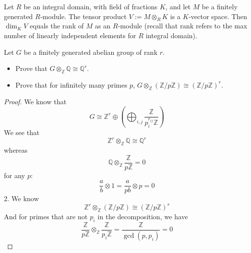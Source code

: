 \documentclass[openany]{book}
\newcommand{\Z}{\mathbb{Z}}
\newcommand{\Q}{\mathbb{Q}}
\begin{document}
    \begin{prop}[2.8]
    Let \( R \) be an integral domain, with field of fractions \( K \), and let \( M \) be a finitely generated \( R \)-module. The tensor product \( V := M \otimes_R K \) is a \( K \)-vector space. Then \(\dim_K V\) equals the rank of \( M \) as an \( R \)-module (recall that rank refers to the max number of linearly  independent elements for $R$ integral domain).
    \end{prop}


    
    \begin{prob}[2.9]
    Let \( G \) be a finitely generated abelian group of rank \( r \).
    
    \begin{itemize}
        \item Prove that \( G \otimes_{\mathbb{Z}} \mathbb{Q} \cong \mathbb{Q}^r \).
        \item Prove that for infinitely many primes \( p \), \( G \otimes_{\mathbb{Z}} (\mathbb{Z}/p\mathbb{Z}) \cong (\mathbb{Z}/p\mathbb{Z})^r \).
    \end{itemize}
    \end{prob}
\begin{proof}
    We know that 
    \begin{equation*}
        G\cong\Z^r\oplus\left(\bigoplus_{i,j}\frac{\Z}{p_i^{r_{ij}}\Z}\right)
    \end{equation*}
    We see that 
    \begin{equation*}
        \Z^r\otimes_\Z\Q\cong\Q^r
    \end{equation*}
    whereas 
    \begin{equation*}
        \Q\otimes_\Z\frac{\Z}{p\Z}=0
    \end{equation*}
    for any $p$:
    \begin{equation*}
        \frac{a}{b}\otimes 1=\frac{a}{pb}\otimes p=0
    \end{equation*}
    2. We know 
    \begin{equation*}
        \Z^r\otimes_\Z(\Z/p\Z)\cong(\Z/p\Z)^r
    \end{equation*}
    And for primes that are not $p_i$ in the decomposition, we have 
    \begin{equation*}
        \frac{\Z}{p\Z}\otimes_\Z\frac{\Z}{p_i\Z}=\frac{\Z}{\gcd(p,p_i)}=0
    \end{equation*}
\end{proof}
\end{document}

